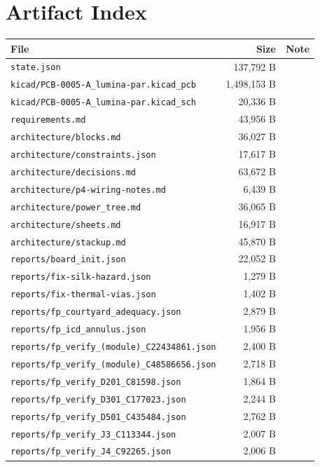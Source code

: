 \documentclass[11pt,a4paper]{article}
\begin{document}
\section{Artifact Index}
{\small
\begin{longtable}{p{9cm}rp{4cm}}
\toprule
\textbf{File} & \textbf{Size} & \textbf{Note} \\
\midrule
\endhead
\texttt{state.json} & 137,792 B &  \\
\texttt{kicad/PCB-0005-A\_lumina-par.kicad\_pcb} & 1,498,153 B &  \\
\texttt{kicad/PCB-0005-A\_lumina-par.kicad\_sch} & 20,336 B &  \\
\texttt{requirements.md} & 43,956 B &  \\
\texttt{architecture/blocks.md} & 36,027 B &  \\
\texttt{architecture/constraints.json} & 17,617 B &  \\
\texttt{architecture/decisions.md} & 63,672 B &  \\
\texttt{architecture/p4-wiring-notes.md} & 6,439 B &  \\
\texttt{architecture/power\_tree.md} & 36,065 B &  \\
\texttt{architecture/sheets.md} & 16,917 B &  \\
\texttt{architecture/stackup.md} & 45,870 B &  \\
\texttt{reports/board\_init.json} & 22,052 B &  \\
\texttt{reports/fix-silk-hazard.json} & 1,279 B &  \\
\texttt{reports/fix-thermal-vias.json} & 1,402 B &  \\
\texttt{reports/fp\_courtyard\_adequacy.json} & 2,879 B &  \\
\texttt{reports/fp\_icd\_annulus.json} & 1,956 B &  \\
\texttt{reports/fp\_verify\_(module)\_C22434861.json} & 2,400 B &  \\
\texttt{reports/fp\_verify\_(module)\_C48586656.json} & 2,718 B &  \\
\texttt{reports/fp\_verify\_D201\_C81598.json} & 1,864 B &  \\
\texttt{reports/fp\_verify\_D301\_C177023.json} & 2,244 B &  \\
\texttt{reports/fp\_verify\_D501\_C435484.json} & 2,762 B &  \\
\texttt{reports/fp\_verify\_J3\_C113344.json} & 2,007 B &  \\
\texttt{reports/fp\_verify\_J4\_C92265.json} & 2,006 B &  \\

\end{longtable}}
\end{document}
